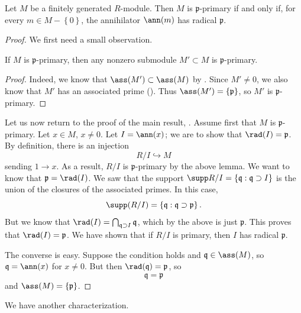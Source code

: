 \begin{proposition} \label{whenisprimary}
Let $M$ be a finitely generated $R$-module. Then $M$ is \textbf{$\mathfrak{p}$}-primary if
and only if, for every $m \in M - \left\{0\right\}$, 
the annihilator $\ann(m)$ has radical $\mathfrak{p}$.
\end{proposition} 
\begin{proof} 
We first need a small observation.

\begin{lemma} 
If $M$ is $\mathfrak{p}$-primary, then any nonzero submodule $M' \subset M$ is
$\mathfrak{p}$-primary.
\end{lemma} 
\begin{proof} 
Indeed, we know that $\ass(M') \subset \ass(M)$ by .
Since $M' \neq 0$, we also know that $M'$ has an associated prime
(). Thus $ \ass(M') = \{\mathfrak{p}\}$, so
$M'$ is $\mathfrak{p}$-primary.
\end{proof} 

Let us now return to the proof of the main result,
.
Assume first that $M$ is $\mathfrak{p}$-primary. Let $x \in M$, $x \neq 0$. Let
$I = \ann(x)$; we are to show that $\rad(I)  =\mathfrak{p}$. By definition, there is an injection
\[ R/I \hookrightarrow M  \]
sending $1 \to x$. As a result, $R/I$ is $\mathfrak{p}$-primary by the above
lemma. We want to know that $\mathfrak{p}  = \rad(I)$. 
We saw that the support $\supp R/I = \left\{\mathfrak{q}: \mathfrak{q}
\supset I\right\}$ is the union of the closures of the associated primes. In
this case, 
\[ \supp(R/I) = \left\{\mathfrak{q}: \mathfrak{q} \supset \mathfrak{p}\right\}
.\]
But we know that $\rad(I) = \bigcap_{\mathfrak{q} \supset I} \mathfrak{q}$,
which by the above is just $\mathfrak{p}$. This proves that $\rad(I) =
\mathfrak{p}$.
We have shown that if $R/I$ is primary, then $I$ has radical $\mathfrak{p}$.

The converse is easy. 
Suppose the condition holds and $\mathfrak{q} \in \ass(M)$, so $\mathfrak{q} =
\ann(x)$ for $x \neq 0$. But then $\rad(\mathfrak{q}) = \mathfrak{p}$, so 
\[ \mathfrak{q} = \mathfrak{p}  \] and $\ass(M) = \left\{\mathfrak{p}\right\}$.
\end{proof} 

We have another characterization.

